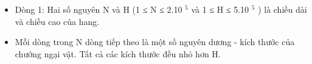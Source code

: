\begin{itemize}
	\item Dòng 1: Hai số nguyên N và H (1 ≤ N ≤ 2.10 $^ 5 $ và 1 ≤ H ≤ 5.10 $^ 5 $ ) là chiều dài và chiều cao của hang.
	\item Mỗi dòng trong N dòng tiếp theo là một số nguyên dương - kích thước của chướng ngại vật. Tất cả các kích thước đều nhỏ hơn H.
\end{itemize}